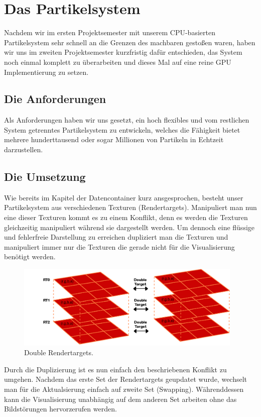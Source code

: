 \section{Das Partikelsystem}
\begin{Spacing}{\mylinespace}

Nachdem wir im ersten Projektsemester mit unserem CPU-basierten Partikelsystem sehr schnell an die Grenzen des machbaren gestoßen waren, haben wir uns im zweiten Projektsemester kurzfristig dafür entschieden, das System noch einmal komplett zu überarbeiten und dieses Mal auf eine reine GPU Implementierung zu setzen.

\subsection{Die Anforderungen}

Als Anforderungen haben wir uns gesetzt, ein hoch flexibles und vom restlichen System getrenntes Partikelsystem zu entwickeln, welches die Fähigkeit bietet mehrere hunderttausend oder sogar Millionen von Partikeln in Echtzeit darzustellen.  

\subsection{Die Umsetzung}
Wie bereits im Kapitel der Datencontainer kurz ansgesprochen, besteht unser Partikelsystem aus verschiedenen Texturen (Rendertargets).
Manipuliert man nun eine dieser Texturen kommt es zu einem Konflikt, denn es werden die Texturen gleichzeitig manipuliert während sie dargestellt werden.
Um dennoch eine flüssige und fehlerfreie Darstellung zu erreichen dupliziert man die Texturen und manipuliert immer nur die Texturen die gerade nicht für die Visualisierung benötigt werden.
\begin{figure}[h!]
	\centering
	\vspace*{30px}
	\includegraphics[width=410px]{graphics/DoubleTargets2.png}
	\caption{Double Rendertargets.}
	\label{fig:RTCahnnels}
\end{figure}
Durch die Duplizierung ist es nun einfach den beschriebenen Konflikt zu umgehen. Nachdem das erste Set der Rendertargets geupdatet wurde, wechselt man für die Aktualsierung einfach auf zweite Set (Swapping). Währenddessen kann die Visualisierung unabhängig auf dem anderen Set arbeiten ohne das Bildstörungen hervorzerufen werden.


\end{Spacing}
